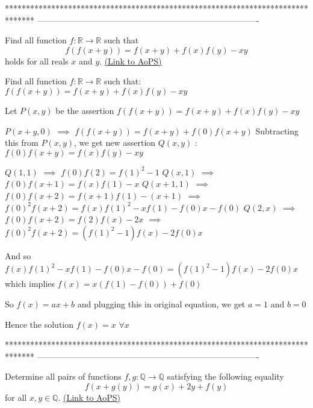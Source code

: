 *******************************************************************************
-------------------------------------------------------------------------------

\begin{problem}
	Find all function $f:\mathbb{R}\to\mathbb{R}$ such that
\[f(f(x+y))=f(x+y)+f(x)f(y)-xy\]
holds for all reals $x$ and $y$.
	\flushright \href{https://artofproblemsolving.com/community/c6h416632}{(Link to AoPS)}
\end{problem}



\begin{solution}
	\begin{tcolorbox}Find all function $f:\mathbb{R}\rightarrow \mathbb{R}$ such that:
   $f(f(x+y))=f(x+y)+f(x)f(y)-xy$\end{tcolorbox}
Let $P(x,y)$ be the assertion $f(f(x+y))=f(x+y)+f(x)f(y)-xy$

$P(x+y,0)$ $\implies$ $f(f(x+y))=f(x+y)+f(0)f(x+y)$
Subtracting this from $P(x,y)$, we get new assertion $Q(x,y)$ : $f(0)f(x+y)=f(x)f(y)-xy$

$Q(1,1)$ $\implies$ $f(0)f(2)=f(1)^2-1$
$Q(x,1)$ $\implies$ $f(0)f(x+1)=f(x)f(1)-x$
$Q(x+1,1)$ $\implies$ $f(0)f(x+2)=f(x+1)f(1)-(x+1)$ $\implies$ $f(0)^2f(x+2)=f(x)f(1)^2-xf(1)-f(0)x-f(0)$
$Q(2,x)$ $\implies$ $f(0)f(x+2)=f(2)f(x)-2x$ $\implies$ $f(0)^2f(x+2)=(f(1)^2-1)f(x)-2f(0)x$

And so $f(x)f(1)^2-xf(1)-f(0)x-f(0)=(f(1)^2-1)f(x)-2f(0)x$ which implies $f(x)=x(f(1)-f(0))+f(0)$

So $f(x)=ax+b$ and plugging this in original equation, we get $a=1$ and $b=0$

Hence the solution $\boxed{f(x)=x}$ $\forall x$
\end{solution}
*******************************************************************************
-------------------------------------------------------------------------------

\begin{problem}
	Determine all pairs of functions $f,g:\mathbb{Q} \to\mathbb{Q}$ satisfying the following equality
\[  f(x+g(y))=g(x)+2y+f(y)\]
for all  $x,y \in \mathbb{Q}.$
	\flushright \href{https://artofproblemsolving.com/community/c6h427313}{(Link to AoPS)}
\end{problem}



